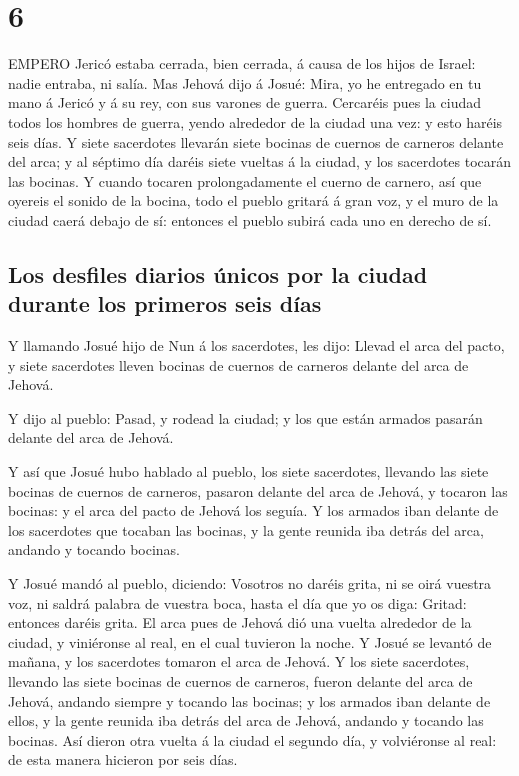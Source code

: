 \hypertarget{section-5}{%
\section{6}\label{section-5}}

 EMPERO Jericó estaba cerrada, bien cerrada, á causa de los
hijos de Israel: nadie entraba, ni salía.  Mas Jehová dijo á
Josué: Mira, yo he entregado en tu mano á Jericó y á su rey, con sus
varones de guerra.  Cercaréis pues la ciudad todos los
hombres de guerra, yendo alrededor de la ciudad una vez: y esto haréis
seis días.  Y siete sacerdotes llevarán siete bocinas de
cuernos de carneros delante del arca; y al séptimo día daréis siete
vueltas á la ciudad, y los sacerdotes tocarán las bocinas. 
Y cuando tocaren prolongadamente el cuerno de carnero, así que oyereis
el sonido de la bocina, todo el pueblo gritará á gran voz, y el muro de
la ciudad caerá debajo de sí: entonces el pueblo subirá cada uno en
derecho de sí.

\hypertarget{los-desfiles-diarios-uxfanicos-por-la-ciudad-durante-los-primeros-seis-duxedas}{%
\subsection{Los desfiles diarios únicos por la ciudad durante los
primeros seis
días}\label{los-desfiles-diarios-uxfanicos-por-la-ciudad-durante-los-primeros-seis-duxedas}}

 Y llamando Josué hijo de Nun á los sacerdotes, les dijo:
Llevad el arca del pacto, y siete sacerdotes lleven bocinas de cuernos
de carneros delante del arca de Jehová.

 Y dijo al pueblo: Pasad, y rodead la ciudad; y los que
están armados pasarán delante del arca de Jehová.

 Y así que Josué hubo hablado al pueblo, los siete
sacerdotes, llevando las siete bocinas de cuernos de carneros, pasaron
delante del arca de Jehová, y tocaron las bocinas: y el arca del pacto
de Jehová los seguía.  Y los armados iban delante de los
sacerdotes que tocaban las bocinas, y la gente reunida iba detrás del
arca, andando y tocando bocinas.

 Y Josué mandó al pueblo, diciendo: Vosotros no daréis
grita, ni se oirá vuestra voz, ni saldrá palabra de vuestra boca, hasta
el día que yo os diga: Gritad: entonces daréis grita.  El
arca pues de Jehová dió una vuelta alrededor de la ciudad, y viniéronse
al real, en el cual tuvieron la noche.  Y Josué se levantó
de mañana, y los sacerdotes tomaron el arca de Jehová.  Y
los siete sacerdotes, llevando las siete bocinas de cuernos de carneros,
fueron delante del arca de Jehová, andando siempre y tocando las
bocinas; y los armados iban delante de ellos, y la gente reunida iba
detrás del arca de Jehová, andando y tocando las bocinas. 
Así dieron otra vuelta á la ciudad el segundo día, y volviéronse al
real: de esta manera hicieron por seis días.

